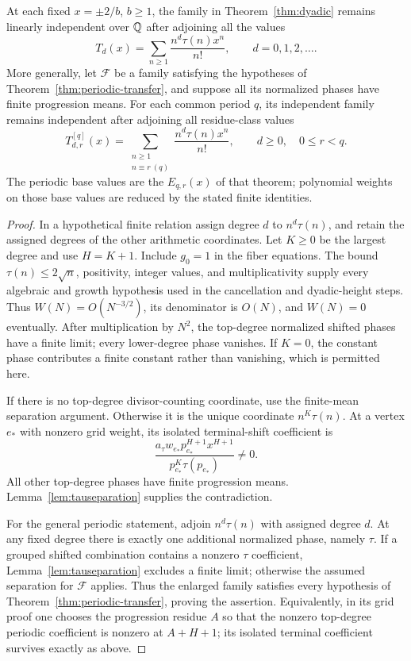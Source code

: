 \begin{theorem}\label{thm:taumoments}
At each fixed $x=\pm2/b$, $b\geq1$, the family in
Theorem~\ref{thm:dyadic} remains linearly independent over $\mathbb Q$ after
adjoining all the values
\[
 T_d(x)=\sum_{n\geq1}\frac{n^d\tau(n)x^n}{n!},\qquad d=0,1,2,\ldots.
\]
More generally, let $\mathcal F$ be a family satisfying the hypotheses of
Theorem~\ref{thm:periodic-transfer}, and suppose all its normalized phases
have finite progression means. For each common period $q$, its independent
family remains independent after adjoining all residue-class values
\[
 T_{d,r}^{[q]}(x)=
    \sum_{\substack{n\geq1\\n\equiv r\ (q)}}
          \frac{n^d\tau(n)x^n}{n!},
 \qquad d\geq0,\quad 0\leq r<q.
\]
The periodic base values are the $E_{q,r}(x)$ of that theorem; polynomial
weights on those base values are reduced by the stated finite identities.
\end{theorem}
\begin{proof}
In a hypothetical finite relation assign degree $d$ to $n^d\tau(n)$,
and retain the assigned degrees of the other arithmetic coordinates.
Let $K\geq0$ be the largest degree and use $H=K+1$. Include $g_0=1$ in
the fiber equations. The bound $\tau(n)\leq2\sqrt n$, positivity,
integer values, and multiplicativity supply every algebraic and growth
hypothesis used in the cancellation and dyadic-height steps.
Thus $W(N)=O(N^{-3/2})$, its denominator is $O(N)$, and $W(N)=0$
eventually. After multiplication by $N^2$, the top-degree normalized
shifted phases have a finite limit; every lower-degree phase vanishes.
If $K=0$, the constant phase contributes a finite constant rather than
vanishing, which is permitted here.

If there is no top-degree divisor-counting coordinate, use the finite-mean
separation argument. Otherwise it is the unique coordinate $n^K\tau(n)$.
At a vertex $e_*$ with nonzero grid weight, its isolated terminal-shift
coefficient is
\[
 \frac{a_\tau w_{e_*}p_{e_*}^{H+1}x^{H+1}}
      {p_{e_*}^K\tau(p_{e_*})}\ne0.
\]
All other top-degree phases have finite progression means.
Lemma~\ref{lem:tauseparation} supplies the contradiction.

For the general periodic statement, adjoin $n^d\tau(n)$ with assigned
degree $d$. At any fixed degree there is exactly one additional normalized
phase, namely $\tau$. If a grouped shifted combination contains a nonzero
$\tau$ coefficient, Lemma~\ref{lem:tauseparation} excludes a finite limit;
otherwise the assumed separation for $\mathcal F$ applies. Thus the
enlarged family satisfies every hypothesis of
Theorem~\ref{thm:periodic-transfer}, proving the assertion. Equivalently,
in its grid proof one chooses the progression residue $A$ so that the
nonzero top-degree periodic coefficient is nonzero at $A+H+1$; its isolated
terminal coefficient survives exactly as above.
\end{proof}

